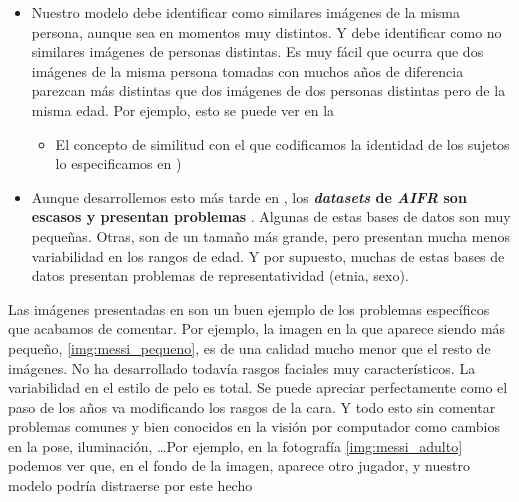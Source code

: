 \begin{itemize}
	\item Nuestro modelo debe identificar como similares imágenes de la misma persona, aunque sea en momentos muy distintos. Y debe identificar como no similares imágenes de personas distintas. Es muy fácil que ocurra que dos imágenes de la misma persona tomadas con muchos años de diferencia parezcan más distintas que dos imágenes de dos personas distintas pero de la misma edad. Por ejemplo, esto se puede ver en la 
	      \begin{itemize}
		      \item El concepto de similitud con el que codificamos la identidad de los sujetos lo especificamos en )
	      \end{itemize}
	\item Aunque desarrollemos esto más tarde en , los \textbf{\textit{datasets} de \textit{AIFR} son escasos y presentan problemas} \cite{informatica:tecnica_sintesis_aifr}. Algunas de estas bases de datos son muy pequeñas. Otras, son de un tamaño más grande, pero presentan mucha menos variabilidad en los rangos de edad. Y por supuesto, muchas de estas bases de datos presentan problemas de representatividad (etnia, sexo).
\end{itemize}

Las imágenes presentadas en  son un buen ejemplo de los problemas específicos que acabamos de comentar. Por ejemplo, la imagen en la que aparece siendo más pequeño, \ref{img:messi_pequeno}, es de una calidad mucho menor que el resto de imágenes. No ha desarrollado todavía rasgos faciales muy característicos. La variabilidad en el estilo de pelo es total. Se puede apreciar perfectamente como el paso de los años va modificando los rasgos de la cara. Y todo esto sin comentar problemas comunes y bien conocidos en la visión por computador como cambios en la pose, iluminación, \ldots Por ejemplo, en la fotografía \ref{img:messi_adulto} podemos ver que, en el fondo de la imagen, aparece otro jugador, y nuestro modelo podría distraerse por este hecho

